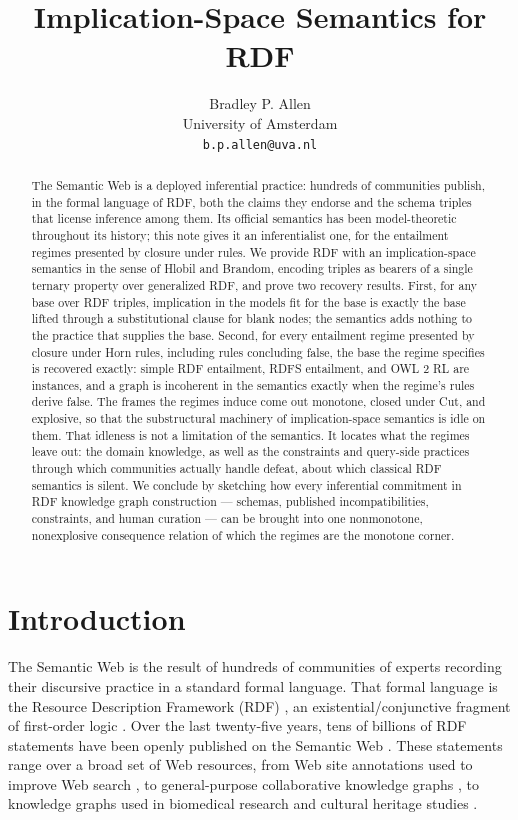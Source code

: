 \documentclass[12pt]{article}
\title{Implication-Space Semantics for RDF}
\author{Bradley P. Allen\\
  University of Amsterdam\\
  \texttt{b.p.allen@uva.nl}}
\date{}
\theoremstyle{definition}
\begin{document}
\maketitle

\begin{abstract}
The Semantic Web is a deployed inferential practice: hundreds of communities publish, in the formal language of RDF, both the claims they endorse and the schema triples that license inference among them. Its official semantics has been model-theoretic throughout its history; this note gives it an inferentialist one, for the entailment regimes presented by closure under rules. We provide RDF with an implication-space semantics in the sense of Hlobil and Brandom, encoding triples as bearers of a single ternary property over generalized RDF, and prove two recovery results. First, for any base over RDF triples, implication in the models fit for the base is exactly the base lifted through a substitutional clause for blank nodes; the semantics adds nothing to the practice that supplies the base. Second, for every entailment regime presented by closure under Horn rules, including rules concluding false, the base the regime specifies is recovered exactly: simple RDF entailment, RDFS entailment, and OWL 2 RL are instances, and a graph is incoherent in the semantics exactly when the regime's rules derive false. The frames the regimes induce come out monotone, closed under Cut, and explosive, so that the substructural machinery of implication-space semantics is idle on them. That idleness is not a limitation of the semantics. It locates what the regimes leave out: the domain knowledge, as well as the constraints and query-side practices through which communities actually handle defeat, about which classical RDF semantics is silent. We conclude by sketching how every inferential commitment in RDF knowledge graph construction --- schemas, published incompatibilities, constraints, and human curation --- can be brought into one nonmonotone, nonexplosive consequence relation of which the regimes are the monotone corner.
\end{abstract}

\section{Introduction}
\label{sec:intro}

The Semantic Web \citep{bernerslee2001semantic} is the result of hundreds of communities of experts recording their discursive practice in a standard formal language. That formal language is the Resource Description Framework (RDF) \citep{cyganiak2014rdf,hayes2014rdf}, an existential/conjunctive fragment of first-order logic \citep{terhorst2005completeness}. Over the last twenty-five years, tens of billions of RDF statements have been openly published on the Semantic Web \citep{fernandez2017lodalot,meusel2014webdatacommons}. These statements range over a broad set of Web resources, from Web site annotations used to improve Web search \citep{guha2016schema}, to general-purpose collaborative knowledge graphs \citep{vrandecic2014wikidata}, to knowledge graphs used in biomedical research \citep{nicholson2020constructing} and cultural heritage studies \citep{zhu2026knowledge}.
\end{document}
